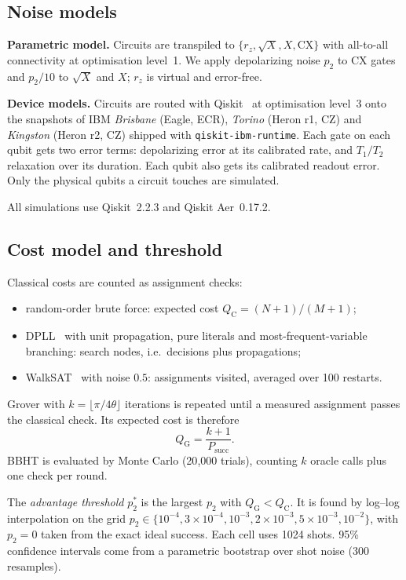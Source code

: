 \documentclass[conference]{IEEEtran}
\begin{document}
\subsection{Noise models}
\textbf{Parametric model.} Circuits are transpiled to $\{r_z, \sqrt{X}, X, \mathrm{CX}\}$ with all-to-all connectivity at optimisation level~1. We apply depolarizing noise $p_2$ to CX gates and $p_2/10$ to $\sqrt{X}$ and $X$; $r_z$ is virtual and error-free.

\textbf{Device models.} Circuits are routed with Qiskit~\cite{qiskit2024} at optimisation level~3 onto the snapshots of IBM \emph{Brisbane} (Eagle, ECR), \emph{Torino} (Heron r1, CZ) and \emph{Kingston} (Heron r2, CZ) shipped with \texttt{qiskit-ibm-runtime}. Each gate on each qubit gets two error terms: depolarizing error at its calibrated rate, and $T_1/T_2$ relaxation over its duration. Each qubit also gets its calibrated readout error. Only the physical qubits a circuit touches are simulated.

All simulations use Qiskit~2.2.3 and Qiskit Aer~0.17.2.

\subsection{Cost model and threshold}
Classical costs are counted as assignment checks:
\begin{itemize}
\item random-order brute force: expected cost $Q_\text{C}=(N+1)/(M+1)$;
\item DPLL~\cite{dll1962} with unit propagation, pure literals and most-frequent-variable branching: search nodes, i.e.\ decisions plus propagations;
\item WalkSAT~\cite{selman1994} with noise $0.5$: assignments visited, averaged over 100 restarts.
\end{itemize}
Grover with $k=\lfloor\pi/4\theta\rfloor$ iterations is repeated until a measured assignment passes the classical check. Its expected cost is therefore
\begin{equation}
Q_\text{G} = \frac{k+1}{P_\text{succ}}.
\label{eq:qg}
\end{equation}
BBHT is evaluated by Monte Carlo (20{,}000 trials), counting $k$ oracle calls plus one check per round.

The \emph{advantage threshold} $p_2^*$ is the largest $p_2$ with $Q_\text{G} < Q_\text{C}$. It is found by log--log interpolation on the grid $p_2\in\{10^{-4},3{\times}10^{-4},10^{-3},2{\times}10^{-3},5{\times}10^{-3},10^{-2}\}$, with $p_2=0$ taken from the exact ideal success. Each cell uses 1024 shots. 95\% confidence intervals come from a parametric bootstrap over shot noise (300 resamples).
\end{document}
